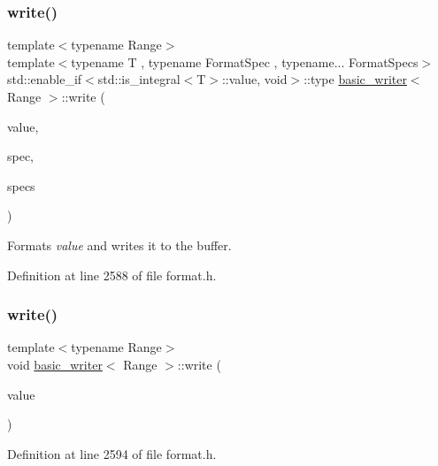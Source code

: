 \subsubsection{\texorpdfstring{write()}{write()}\hspace{0.1cm}{\footnotesize\ttfamily [7/16]}}
{\footnotesize\ttfamily template$<$typename Range$>$ \\
template$<$typename T , typename Format\+Spec , typename... Format\+Specs$>$ \\
std\+::enable\+\_\+if$<$std\+::is\+\_\+integral$<$T$>$\+::value, void$>$\+::type \hyperlink{classbasic__writer}{basic\+\_\+writer}$<$ Range $>$\+::write (\begin{DoxyParamCaption}\item[{T}]{value,  }\item[{Format\+Spec}]{spec,  }\item[{Format\+Specs...}]{specs }\end{DoxyParamCaption})\hspace{0.3cm}{\ttfamily [inline]}}

Formats {\itshape value} and writes it to the buffer.  

Definition at line 2588 of file format.\+h.

\mbox{\label{classbasic__writer_aa1734a46d67c4f0aa23c45c648360d61}} 
\subsubsection{\texorpdfstring{write()}{write()}\hspace{0.1cm}{\footnotesize\ttfamily [8/16]}}
{\footnotesize\ttfamily template$<$typename Range$>$ \\
void \hyperlink{classbasic__writer}{basic\+\_\+writer}$<$ Range $>$\+::write (\begin{DoxyParamCaption}\item[{double}]{value }\end{DoxyParamCaption})\hspace{0.3cm}{\ttfamily [inline]}}



Definition at line 2594 of file format.\+h.

\mbox{\label{classbasic__writer_a76b033a93868ee4692055c9567436c7a}} 
